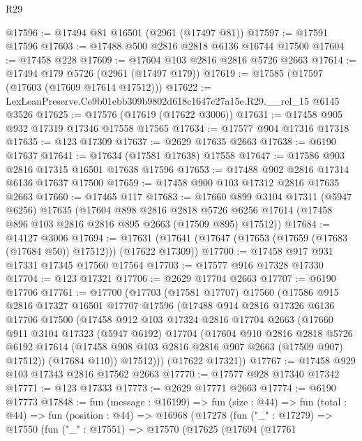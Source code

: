 \begin{lexlean}{R29}
\begin{coremodule}
@17596 := @17494 @81 @16501 (@2961 (@17497 @81))
@17597 := @17591 @17596
@17603 := @17488 @500 @2816 @2818 @6136 @16744 @17500
@17604 := @17458 @228
@17609 := @17604 @103 @2816 @2816 @5726 @2663
@17614 := @17494 @179 @5726 (@2961 (@17497 @179))
@17619 := @17585 (@17597 (@17603 (@17609 @17614 @17512)))
@17622 := LexLeanPreserve.Ce9b01ebb309b9802d618c1647c27a15e.R29.__rel_15 @6145 @3526
@17625 := @17576 (@17619 (@17622 @3006))
@17631 := @17458 @905 @932 @17319 @17346 @17558 @17565
@17634 := @17577 @904 @17316 @17318
@17635 := @123 @17309
@17637 := @2629 @17635 @2663
@17638 := @6190 @17637
@17641 := @17634 (@17581 @17638) @17558
@17647 := @17586 @903 @2816 @17315 @16501 @17638 @17596
@17653 := @17488 @902 @2816 @17314 @6136 @17637 @17500
@17659 := @17458 @900 @103 @17312 @2816 @17635 @2663
@17660 := @17465 @117
@17683 := @17660
    @899
    @3104
    @17311
    (@5947 @6256)
    @17635
    (@17604
      @898
      @2816
      @2818
      @5726
      @6256
      @17614
      (@17458 @896 @103 @2816 @2816 @895 @2663 (@17509 @895) @17512))
@17684 := @14127 @3006
@17694 := @17631 (@17641 (@17647 (@17653 (@17659 (@17683 (@17684 @50)) @17512))) (@17622 @17309))
@17700 := @17458 @917 @931 @17331 @17345 @17560 @17564
@17703 := @17577 @916 @17328 @17330
@17704 := @123 @17321
@17706 := @2629 @17704 @2663
@17707 := @6190 @17706
@17761 := @17700
    (@17703
      (@17581 @17707)
      @17560
      (@17586
        @915
        @2816
        @17327
        @16501
        @17707
        @17596
        (@17488
          @914
          @2816
          @17326
          @6136
          @17706
          @17500
          (@17458
            @912
            @103
            @17324
            @2816
            @17704
            @2663
            (@17660
              @911
              @3104
              @17323
              (@5947 @6192)
              @17704
              (@17604
                @910
                @2816
                @2818
                @5726
                @6192
                @17614
                (@17458 @908 @103 @2816 @2816 @907 @2663 (@17509 @907) @17512))
              (@17684 @110))
            @17512)))
      (@17622 @17321))
@17767 := @17458 @929 @103 @17343 @2816 @17562 @2663
@17770 := @17577 @928 @17340 @17342
@17771 := @123 @17333
@17773 := @2629 @17771 @2663
@17774 := @6190 @17773
@17848 := fun (message : @16199) =>
  fun (size : @44) =>
  fun (total : @44) =>
  fun (position : @44) =>
  @16968
    (@17278
      (fun ("_" : @17279) =>
      @17550
        (fun ("_" : @17551) =>
        @17570
          (@17625
            (@17694
              (@17761

\end{coremodule}
\end{lexlean}
